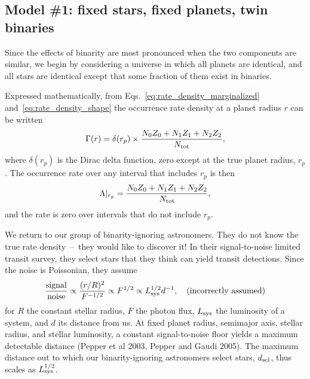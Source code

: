 \subsection{Model \#1: fixed stars, fixed planets, twin binaries}
\label{sec:model_1}

Since the effects of binarity are most pronounced when the two components are 
similar, we begin by considering a universe in which all planets are 
identical, and all stars are identical except that some fraction of them exist 
in binaries.

Expressed mathematically, from Eqs.~\ref{eq:rate_density_marginalized}
and~\ref{eq:rate_density_shape} the occurrence rate density at a planet radius 
$r$ can be written
\begin{equation}
\Gamma(r) = \delta(r_p) \times
\frac{
    N_0 Z_0 +
    N_1 Z_1 +
    N_2 Z_2
}{N_{\rm tot}},
\label{eq:model_1_rate_density}
\end{equation}
where $\delta(r_p)$ is the Dirac delta function, zero except at the true 
planet radius, $r_p$.
The occurrence rate over any interval that includes $r_p$ is then
\begin{equation}
\Lambda|_{r_p} = \frac{
    N_0 Z_0 +
    N_1 Z_1 +
    N_2 Z_2 
}{N_{\rm tot}},
\label{eq:model_1_rate}
\end{equation}
and the rate is zero over intervals that do not include $r_p$.

We return to our group of binarity-ignoring astronomers. They do 
not know the true rate density~--~they would like to discover it!
In their signal-to-noise limited transit survey, they select stars 
that they think can yield transit detections.
Since the noise is Poissonian, they assume
\begin{equation}
\frac{{\rm signal}}{{\rm noise}}
\propto \frac{(r/R)^2}{F^{-1/2}}
\propto F^{1/2}
\propto L_{\rm sys}^{1/2} d^{-1}, \quad ({\rm incorrectly\ assumed})
\end{equation}
for $R$ the constant stellar radius, $F$ the photon flux, $L_{\rm sys}$ the 
luminosity of a system, and $d$ its distance from us.
At fixed planet radius, semimajor axis, stellar radius, and stellar luminosity,
a constant signal-to-noise floor yields a maximum detectable 
distance (Pepper et al 2003, Pepper and Gaudi 2005).
The maximum distance out to which our binarity-ignoring astronomers 
select stars, $d_{\rm sel}$, thus scales as $L_{\rm sys}^{1/2}$.

